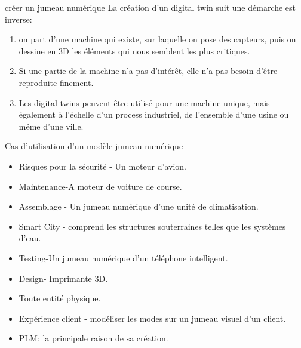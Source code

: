 \documentclass{beamer}
\begin{document}
 \begin{frame}{créer un jumeau numérique}
  La création d'un digital twin suit une démarche est inverse:
  \begin{enumerate}
   \item on part d'une machine qui existe, sur laquelle on pose des capteurs, puis on dessine en 3D les éléments 
   qui nous semblent les plus critiques.
   \item  Si une partie de la machine n'a pas d'intérêt, elle n'a pas besoin d'être reproduite finement.
   \item  Les digital twins peuvent être utilisé pour une machine unique, mais également à l'échelle d'un process industriel, de l'ensemble d'une usine ou même d'une ville.
  \end{enumerate} 
  \end{frame}
 \begin{frame}{Cas d'utilisation d'un modèle jumeau numérique}
	 \begin{itemize}
       \item Risques pour la sécurité - Un moteur d'avion.
       \item Maintenance-A moteur de voiture de course.
       \item Assemblage - Un jumeau numérique d'une unité de climatisation.
       \item Smart City - comprend les structures souterraines telles que les systèmes d'eau.
       \item Testing-Un jumeau numérique d'un téléphone intelligent.
       \item Design- Imprimante 3D.
       \item Toute entité physique.
       \item Expérience client - modéliser les modes sur un jumeau visuel d'un client.
       \item PLM: la principale raison de sa création.
	 \end{itemize}
 \end{frame}	 
\end{document}
